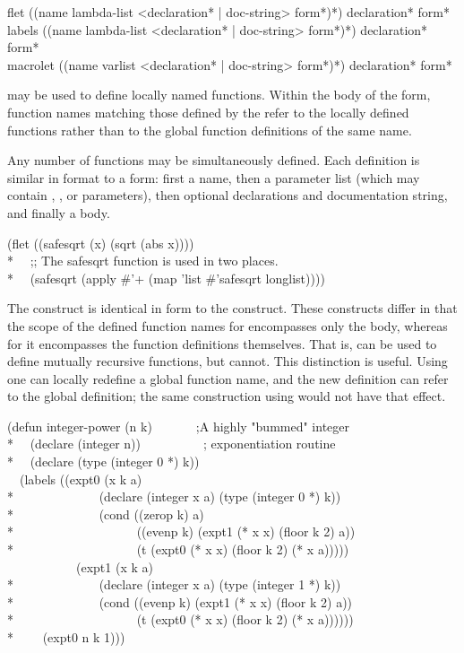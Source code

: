 \begin{defspec}
flet ({(name lambda-list
        <{declaration}* | doc-string> {form}*)}*)
     {declaration}* {form}* \\
labels ({(name lambda-list
          <{declaration}* | doc-string> {form}*)}*)
       {declaration}* {form}* \\
macrolet ({(name varlist
            <{declaration}* | doc-string> {form}*)}*)
         {declaration}* {form}*

 may be used to define locally named functions.  Within the
body of the  form, function names matching those defined
by the  refer to the locally defined functions rather than to
the global function definitions of the same name.

Any number of functions may be simultaneously defined.  Each definition
is similar in format to a  form: first a name,
then a parameter list (which may contain , , or 
parameters), then optional declarations and documentation string,
and finally a body.
\begin{lisp}
(flet ((safesqrt (x) (sqrt (abs x)))) \\*
~~;; The safesqrt function is used in two places. \\*
~~(safesqrt (apply \#'+ (map 'list \#'safesqrt longlist))))
\end{lisp}

The  construct is identical in form to the  construct.
These constructs differ
in that the scope of the defined function names for 
encompasses only the body, whereas for  it encompasses the
function definitions themselves.  That is,  can be used to
define mutually recursive functions, but  cannot.  This
distinction is useful.  Using  one can locally redefine a global
function name, and the new definition can refer to the global definition;
the same construction using  would not have that effect.
\begin{lisp}
(defun integer-power (n k)~~~~~~~;A highly "bummed" integer \\*
~~(declare (integer n))~~~~~~~~~~; exponentiation routine \\*
~~(declare (type (integer 0 *) k)) \\
~~(labels ((expt0 (x k a) \\*
~~~~~~~~~~~~~(declare (integer x a) (type (integer 0 *) k)) \\*
~~~~~~~~~~~~~(cond ((zerop k) a) \\*
~~~~~~~~~~~~~~~~~~~((evenp k) (expt1 (* x x) (floor k 2) a)) \\*
~~~~~~~~~~~~~~~~~~~(t (expt0 (* x x) (floor k 2) (* x a))))) \\
~~~~~~~~~~~(expt1 (x k a) \\*
~~~~~~~~~~~~~(declare (integer x a) (type (integer 1 *) k)) \\*
~~~~~~~~~~~~~(cond ((evenp k) (expt1 (* x x) (floor k 2) a)) \\*
~~~~~~~~~~~~~~~~~~~(t (expt0 (* x x) (floor k 2) (* x a)))))) \\*
~~~~(expt0 n k 1)))
\end{lisp}


\end{defspec}
